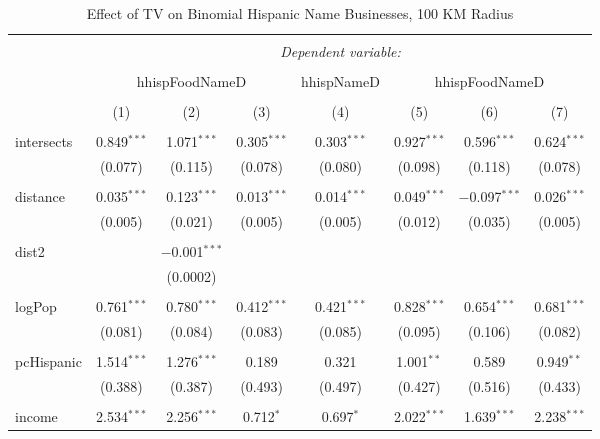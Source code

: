 
\begin{table}[!htbp] \centering 
  \caption{Effect of TV on Binomial Hispanic Name Businesses, 100 KM Radius} 
  \label{} 
\begin{tabular}{@{\extracolsep{-5pt}}lccccccc} 
\\[-1.8ex]\hline 
\hline \\[-1.8ex] 
 & \multicolumn{7}{c}{\textit{Dependent variable:}} \\ 
\cline{2-8} 
\\[-1.8ex] & \multicolumn{3}{c}{hhispFoodNameD} & hhispNameD & \multicolumn{3}{c}{hhispFoodNameD} \\ 
\\[-1.8ex] & (1) & (2) & (3) & (4) & (5) & (6) & (7)\\ 
\hline \\[-1.8ex] 
 intersects & 0.849$^{***}$ & 1.071$^{***}$ & 0.305$^{***}$ & 0.303$^{***}$ & 0.927$^{***}$ & 0.596$^{***}$ & 0.624$^{***}$ \\ 
  & (0.077) & (0.115) & (0.078) & (0.080) & (0.098) & (0.118) & (0.078) \\ 
  & & & & & & & \\ 
 distance & 0.035$^{***}$ & 0.123$^{***}$ & 0.013$^{***}$ & 0.014$^{***}$ & 0.049$^{***}$ & $-$0.097$^{***}$ & 0.026$^{***}$ \\ 
  & (0.005) & (0.021) & (0.005) & (0.005) & (0.012) & (0.035) & (0.005) \\ 
  & & & & & & & \\ 
 dist2 &  & $-$0.001$^{***}$ &  &  &  &  &  \\ 
  &  & (0.0002) &  &  &  &  &  \\ 
  & & & & & & & \\ 
 logPop & 0.761$^{***}$ & 0.780$^{***}$ & 0.412$^{***}$ & 0.421$^{***}$ & 0.828$^{***}$ & 0.654$^{***}$ & 0.681$^{***}$ \\ 
  & (0.081) & (0.084) & (0.083) & (0.085) & (0.095) & (0.106) & (0.082) \\ 
  & & & & & & & \\ 
 pcHispanic & 1.514$^{***}$ & 1.276$^{***}$ & 0.189 & 0.321 & 1.001$^{**}$ & 0.589 & 0.949$^{**}$ \\ 
  & (0.388) & (0.387) & (0.493) & (0.497) & (0.427) & (0.516) & (0.433) \\ 
  & & & & & & & \\ 
 income & 2.534$^{***}$ & 2.256$^{***}$ & 0.712$^{*}$ & 0.697$^{*}$ & 2.022$^{***}$ & 1.639$^{***}$ & 2.238$^{***}$ \\ 

\end{tabular}
\end{table}
